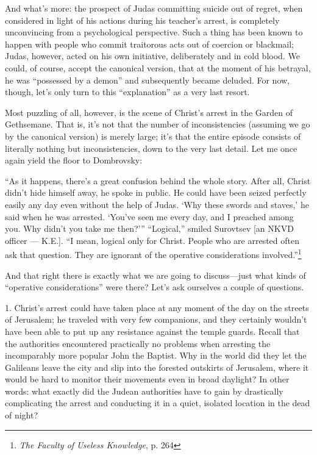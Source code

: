 And what's more: the prospect of Judas committing suicide out of regret, when considered in light of his actions during his teacher's arrest, is completely unconvincing from a psychological perspective. Such a thing has been known to happen with people who commit traitorous acts out of coercion or blackmail; Judas, however, acted on his own initiative, deliberately and in cold blood. We could, of course, accept the canonical version, that at the moment of his betrayal, he was ``possessed by a demon'' and subsequently became deluded. For now, though, let's only turn to this ``explanation'' as a very last resort.

Most puzzling of all, however, is the scene of Christ's arrest in the Garden of Gethsemane. That is, it's not that the number of inconsistencies (assuming we go by the canonical version) is merely large; it's that the entire episode consists of literally nothing but inconsistencies, down to the very last detail. Let me once again yield the floor to Dombrovsky:

\begin{smallquote}
    ``As it happens, there's a great confusion behind the whole story. After all, Christ didn't hide himself away, he spoke in public. He could have been seized perfectly easily any day even without the help of Judas. `Why these swords and staves,' he said when he was arrested. `You've seen me every day, and I preached among you. Why didn't you take me then?''' ``Logical,'' smiled Surovtsev [an NKVD officer --- K.E.]. ``I mean, logical only for Christ. People who are arrested often ask that question. They are ignorant of the operative considerations involved.''\footnote{\emph{The Faculty of Useless Knowledge}, p. 264}
\end{smallquote}

And that right there is exactly what we are going to discuss---just what kinds of ``operative considerations'' were there? Let's ask ourselves a couple of questions.
 
1. Christ's arrest could have taken place at any moment of the day on the streets of Jerusalem; he traveled with very few companions, and they certainly wouldn't have been able to put up any resistance against the temple guards. Recall that the authorities encountered practically no problems when arresting the incomparably more popular John the Baptist. Why in the world did they let the Galileans leave the city and slip into the forested outskirts of Jerusalem, where it would be hard to monitor their movements even in broad daylight? In other words: what exactly did the Judean authorities have to gain by drastically complicating the arrest and conducting it in a quiet, isolated location in the dead of night?

